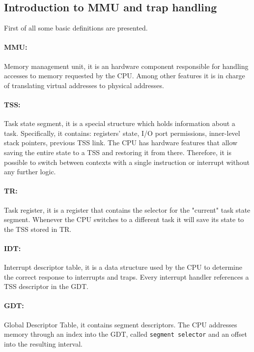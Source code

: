 \documentclass[11pt,twoside,a4paper]{article}
\begin{document}
\subsection{Introduction to MMU and trap handling}

First of all some basic definitions are presented.

\paragraph{MMU: } Memory management unit, it is an hardware component responsible for handling accesses to memory requested by the CPU. Among other features it is in charge of translating virtual addresses to physical addresses.

\paragraph{TSS: } Task state segment, it is a special structure which holds information about a task. Specifically, it contains: registers' state, I/O port permissions, inner-level stack pointers, previous TSS link. The CPU has hardware features that allow saving the entire state to a TSS and restoring it from there. Therefore, it is possible to switch between contexts with a single instruction or interrupt without any further logic.

\paragraph{TR: } Task register, it is a register that contains the selector for the "current" task state segment. Whenever the CPU switches to a different task it will save its state to the TSS stored in TR.

\paragraph{IDT: } Interrupt descriptor table, it is a data structure used by the CPU to determine the correct response to interrupts and traps. Every interrupt handler references a TSS descriptor in the GDT.

\paragraph{GDT: } Global Descriptor Table, it contains segment descriptors. The CPU addresses memory through an index into the GDT, called \texttt{segment selector} and an offset into the resulting interval.
\end{document}
